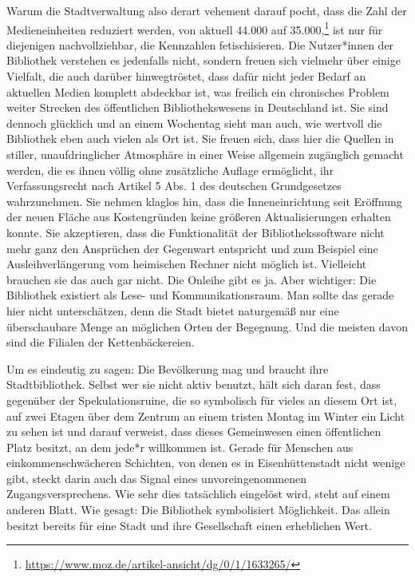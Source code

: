 \documentclass[a4paper,
fontsize=11pt,
oneside,
numbers=noperiodatend,
parskip=half-,
bibliography=totoc,
final
]{scrartcl}
\begin{document}
Warum die Stadtverwaltung also derart vehement darauf pocht, dass die
Zahl der Medieneinheiten reduziert werden, von aktuell 44.000 auf
35.000,\footnote{\url{https://www.moz.de/artikel-ansicht/dg/0/1/1633265/}}
ist nur für diejenigen nachvollziehbar, die Kennzahlen fetischisieren.
Die Nutzer*innen der Bibliothek verstehen es jedenfalls nicht, sondern
freuen sich vielmehr über einige Vielfalt, die auch darüber
hinwegtröstet, dass dafür nicht jeder Bedarf an aktuellen Medien
komplett abdeckbar ist, was freilich ein chronisches Problem weiter
Strecken des öffentlichen Bibliothekswesens in Deutschland ist. Sie sind
dennoch glücklich und an einem Wochentag sieht man auch, wie wertvoll
die Bibliothek eben auch vielen als Ort ist. Sie freuen sich, dass hier
die Quellen in stiller, unaufdringlicher Atmosphäre in einer Weise
allgemein zugänglich gemacht werden, die es ihnen völlig ohne
zusätzliche Auflage ermöglicht, ihr Verfassungsrecht nach Artikel 5 Abs.
1 des deutschen Grundgesetzes wahrzunehmen. Sie nehmen klaglos hin, dass
die Inneneinrichtung seit Eröffnung der neuen Fläche aus Kostengründen
keine größeren Aktualisierungen erhalten konnte. Sie akzeptieren, dass
die Funktionalität der Bibliothekssoftware nicht mehr ganz den
Ansprüchen der Gegenwart entspricht und zum Beispiel eine
Ausleihverlängerung vom heimischen Rechner nicht möglich ist. Vielleicht
brauchen sie das auch gar nicht. Die Onleihe gibt es ja. Aber wichtiger:
Die Bibliothek existiert als Lese- und Kommunikationsraum. Man sollte
das gerade hier nicht unterschätzen, denn die Stadt bietet naturgemäß
nur eine überschaubare Menge an möglichen Orten der Begegnung. Und die
meisten davon sind die Filialen der Kettenbäckereien.

Um es eindeutig zu sagen: Die Bevölkerung mag und braucht ihre
Stadtbibliothek. Selbst wer sie nicht aktiv benutzt, hält sich daran
fest, dass gegenüber der Spekulationsruine, die so symbolisch für vieles
an diesem Ort ist, auf zwei Etagen über dem Zentrum an einem tristen
Montag im Winter ein Licht zu sehen ist und darauf verweist, dass dieses
Gemeinwesen einen öffentlichen Platz besitzt, an dem jede*r willkommen
ist. Gerade für Menschen aus einkommenschwächeren Schichten, von denen
es in Eisenhüttenstadt nicht wenige gibt, steckt darin auch das Signal
eines unvoreingenommenen Zugangsversprechens. Wie sehr dies tatsächlich
eingelöst wird, steht auf einem anderen Blatt. Wie gesagt: Die
Bibliothek symbolisiert Möglichkeit. Das allein besitzt bereits für eine
Stadt und ihre Gesellschaft einen erheblichen Wert.
\end{document}
